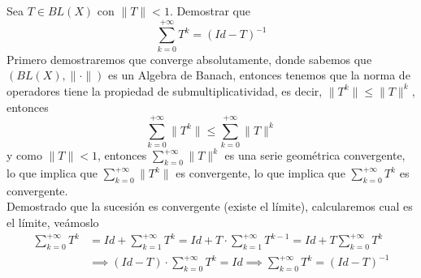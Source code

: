 \begin{ejercicio}
    Sea $T\in BL(X)$ con $\|T\| < 1$. Demostrar que 
    $$\sum_{k=0}^{+\infty} T^k=(Id-T)^{-1}$$
    \noindent
    Primero demostraremos que converge absolutamente, donde sabemos que $(BL(X), \|\cdot\|)$ es un Algebra de Banach, entonces tenemos que la norma de operadores tiene la propiedad de submultiplicatividad, es decir, $\|T^k\| \leq \|T\|^k$, entonces 
    \begin{equation*}
        \sum_{k=0}^{+\infty} \|T^k\| \leq \sum_{k=0}^{+\infty} \|T\|^k
    \end{equation*}
    y como $\|T\| < 1$, entonces $\sum\limits_{k=0}^{+\infty} \|T\|^k$ es una serie geométrica convergente, lo que implica que $\sum\limits_{k=0}^{+\infty} \|T^k\|$ es convergente, lo que implica que $\sum\limits_{k=0}^{+\infty} T^k$ es convergente. \\
    \noindent
    Demostrado que la sucesión es convergente (existe el límite), calcularemos cual es el límite, veámoslo
    \begin{align*}
        \sum_{k=0}^{+\infty} T^k &= Id + \sum_{k=1}^{+\infty} T^k = Id + T \cdot \sum_{k=1}^{+\infty} T^{k-1} = Id + T \sum_{k=0}^{+\infty} T^k \\
        &\implies (Id - T) \cdot \sum_{k=0}^{+\infty} T^k = Id \implies \sum_{k=0}^{+\infty} T^k = (Id - T)^{-1}
    \end{align*}
\end{ejercicio}


